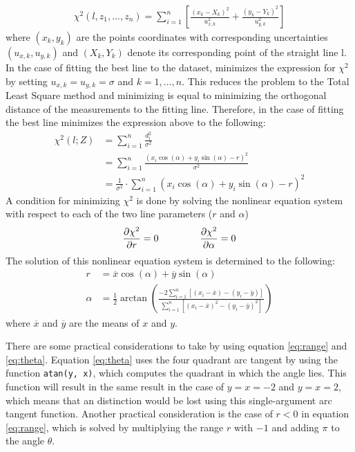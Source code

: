 \documentclass[../Head/Main.tex]{subfiles}
\begin{document}
\begin{align}
    \chi^2\left(l, z_1, ..., z_n\right) = \sum_{i = 1}^{n} \left[\frac{\left(x_k - X_k\right)^2}{u_{x, k}^{2}} + \frac{\left(y_k - Y_k\right)^2}{u_{y, k}^{2}}\right]
\end{align}
where $(x_k,y_k)$ are the points coordinates with corresponding uncertainties $(u_{x, k},u_{y, k})$ and $(X_k,Y_k)$ denote its corresponding point of the straight line l. In the case of fitting the best line to the dataset, minimizes the expression for $\chi^2$ by setting $u_{x, k}=u_{y, k}=\sigma$ and $k=1,…,n$. This reduces the problem to the Total Least Square method and minimizing is equal to minimizing the orthogonal distance of the measurements to the fitting line. Therefore, in the case  of fitting the best line minimizes the expression above to the following:
\begin{align}
    \chi^2\left(l; Z\right) &= \sum_{i = 1}^{n} \frac{d_i^2}{\sigma^2} \\
    &= \sum_{i = 1}^{n}\frac{\left(x_i\cos(\alpha) + y_i\sin⁡(\alpha)-r\right)^2}{\sigma^2}\\
    &= \frac{1}{\sigma^2}\cdot\sum_{i = 1}^{n}\left(x_i\cos(\alpha) + y_i\sin⁡(\alpha)-r\right)^2
\end{align}
A condition for minimizing $\chi^2$ is done by solving the nonlinear equation system with respect to each of the two line parameters ($r$ and $\alpha$)
\begin{align}
    \frac{\partial\chi^2}{\partial r} = 0 \hspace{1.5cm} \frac{\partial\chi^2}{\partial\alpha} = 0
\end{align}
The solution of this nonlinear equation system is determined to the following:
\begin{align}
	r &= \overline{x}\cos(\alpha)+\overline{y}\sin(\alpha) \label{eq:range} \\
    \alpha &= \frac{1}{2}\arctan\left(\frac{-2\sum_{i=1}^{n}\left[\left(x_i-\overline{x}\right) - \left(y_i-\overline{y}\right)\right]}{\sum_{i = 1}^{n}\left[\left(x_i-\overline{x}\right)^2 - \left(y_i-\overline{y}\right)^2\right]}\right) \label{eq:theta}
\end{align}
where $\overline{x}$ and $\overline{y}$ are the means of $x$ and $y$. \par
There are some practical considerations to take by using equation \ref{eq:range} and \ref{eq:theta}. Equation \ref{eq:theta} uses the four quadrant arc tangent by using the function \texttt{atan(y, x)}, which computes the quadrant in which the angle lies. This function will result in the same result in the case of $y  = x = -2$ and $y = x = 2$, which means that an distinction would be lost using this single-argument arc tangent function. Another practical consideration is the case of $r < 0$ in equation \ref{eq:range}, which is solved by multiplying the range $r$ with $-1$ and adding $\pi$ to the angle $\theta$. \par
\end{document}
